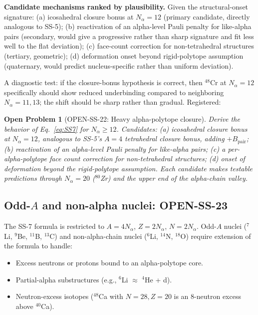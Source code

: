 \documentclass[11pt,letterpaper]{article}
\newtheorem{openproblem}{Open Problem}
\newcommand{\Bpair}{B_{\mathrm{pair}}}
\newcommand{\Nalpha}{N_{\alpha}}
\begin{document}
\textbf{Candidate mechanisms ranked by plausibility.} Given the structural-onset signature: (a) icosahedral closure bonus at $\Nalpha = 12$ (primary candidate, directly analogous to SS-5); (b) reactivation of an alpha-level Pauli penalty for like-alpha pairs (secondary, would give a progressive rather than sharp signature and fit less well to the flat deviation); (c) face-count correction for non-tetrahedral structures (tertiary, geometric); (d) deformation onset beyond rigid-polytope assumption (quaternary, would predict nucleus-specific rather than uniform deviation).

A diagnostic test: if the closure-bonus hypothesis is correct, then ${}^{48}$Cr at $\Nalpha = 12$ specifically should show reduced underbinding compared to neighboring $\Nalpha = 11, 13$; the shift should be sharp rather than gradual. Registered:

\begin{openproblem}[OPEN-SS-22: Heavy alpha-polytope closure]
\label{open:SS22}
Derive the behavior of Eq.~\ref{eq:SS7} for $\Nalpha \geq 12$. Candidates: (a) icosahedral closure bonus at $\Nalpha = 12$, analogous to SS-5's $A = 4$ tetrahedral closure bonus, adding $+\Bpair$; (b) reactivation of an alpha-level Pauli penalty for like-alpha pairs; (c) a per-alpha-polytope face count correction for non-tetrahedral structures; (d) onset of deformation beyond the rigid-polytope assumption. Each candidate makes testable predictions through $\Nalpha = 20$ (${}^{80}$Zr) and the upper end of the alpha-chain valley.
\end{openproblem}

\subsection{Odd-$A$ and non-alpha nuclei: OPEN-SS-23}

The SS-7 formula is restricted to $A = 4\Nalpha$, $Z = 2\Nalpha$, $N = 2\Nalpha$. Odd-$A$ nuclei (${}^7$Li, ${}^9$Be, ${}^{11}$B, ${}^{13}$C) and non-alpha-chain nuclei (${}^6$Li, ${}^{14}$N, ${}^{18}$O) require extension of the formula to handle:
\begin{itemize}
\item Excess neutrons or protons bound to an alpha-polytope core.
\item Partial-alpha substructures (e.g., ${}^6$Li $\approx$ ${}^4$He + d).
\item Neutron-excess isotopes (${}^{48}$Ca with $N = 28, Z = 20$ is an 8-neutron excess above ${}^{40}$Ca).
\end{itemize}
\end{document}
